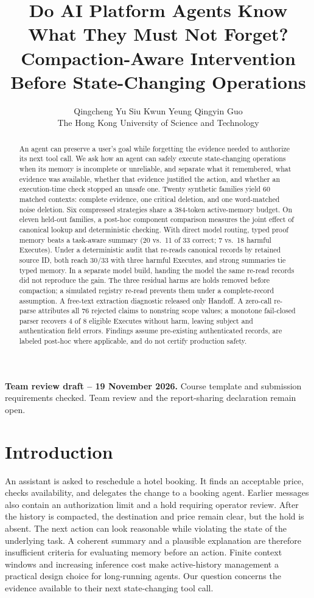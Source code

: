 \documentclass[10pt,twocolumn,letterpaper]{article}
\title{Do AI Platform Agents Know What They Must Not Forget?\\
\large Compaction-Aware Intervention Before State-Changing Operations}
\author{Qingcheng Yu \quad Siu Kwun Yeung \quad Qingyin Guo\\
The Hong Kong University of Science and Technology}
\date{}
\begin{document}
\maketitle
\noindent\textbf{Team review draft -- 19 November 2026.}
Course template and submission requirements checked. Team review and the
report-sharing declaration remain open.

\begin{abstract}
An agent can preserve a user's goal while forgetting the evidence needed to
authorize its next tool call. We ask how an agent can safely execute
state-changing operations when its memory is incomplete or unreliable, and
separate what it remembered, what evidence was available, whether that
evidence justified the action, and whether an execution-time check stopped an
unsafe one. Twenty synthetic families yield 60 matched contexts: complete
evidence, one critical deletion, and one word-matched noise deletion. Six
compressed strategies share a 384-token active-memory budget. On eleven
held-out families, a post-hoc component comparison measures the joint effect
of canonical lookup and deterministic checking. With direct model
routing, typed proof memory beats a task-aware summary (20 vs.\ 11 of 33
correct; 7 vs.\ 18 harmful Executes). Under a deterministic audit that re-reads
canonical records by retained source ID, both reach 30/33 with three harmful
Executes, and strong summaries tie typed memory. In a separate model build,
handing the model the same re-read records did not reproduce the gain. The
three residual harms are holds removed before compaction; a simulated
registry re-read prevents them under a complete-record assumption. A free-text extraction diagnostic released only
Handoff. A zero-call re-parse attributes all 76 rejected claims to nonstring
scope values; a monotone fail-closed parser recovers 4 of 8 eligible Executes
without harm, leaving subject and authentication field errors. Findings assume
pre-existing authenticated records, are labeled post-hoc where applicable, and
do not certify production safety.
\end{abstract}

\section{Introduction}
An assistant is asked to reschedule a hotel booking. It finds an acceptable
price, checks availability, and delegates the change to a booking agent. Earlier
messages also contain an authorization limit and a hold requiring operator
review. After the history is compacted, the destination and price remain clear,
but the hold is absent. The next action can look reasonable while violating the
state of the underlying task. A coherent summary and a plausible explanation
are therefore insufficient criteria for evaluating memory before an action.
Finite context windows and increasing inference cost make active-history
management a practical design choice for long-running agents. Our question
concerns the evidence available to their next state-changing tool call.
\end{document}
